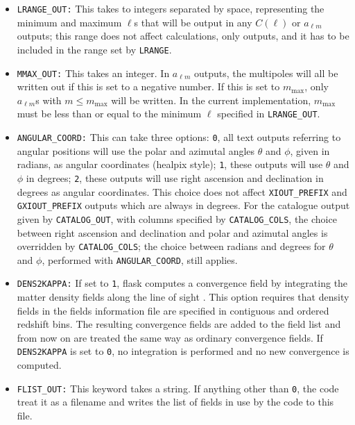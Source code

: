 \documentclass[12pt]{book} %
\newcommand{\nv}[1]{\mathrm{#1}}                 %
\begin{document}
\begin{itemize}
\item {\tt LRANGE\_OUT:} This takes to integers separated by space, representing the minimum and 
  maximum $\ell$s that will be output in any $C(\ell)$ or $a_{\ell m}$ outputs; this range does 
  not affect calculations, only outputs, and it has to be included in the range set by {\tt LRANGE}.
  
\item {\tt MMAX\_OUT:} This takes an integer. In $a_{\ell m}$ outputs, the multipoles will all 
  be written out if this is set to a negative number. If this is set to $m_{\nv{max}}$, only $a_{\ell m}$s 
  with $m\leq m_{\nv{max}}$ will be written. In the current implementation, $m_{\nv{max}}$ must be less than 
  or equal to the minimum $\ell$ specified in {\tt LRANGE\_OUT}.

\item {\tt ANGULAR\_COORD:} This can take three options: {\tt 0}, all text outputs referring 
  to angular positions will use the polar and azimutal angles $\theta$ and $\phi$, given in radians, 
  as angular coordinates ({\sc healpix} style); {\tt 1}, these outputs will use $\theta$ and $\phi$ 
  in degrees; {\tt 2}, these outputs will use right ascension and declination in degrees as 
  angular coordinates. This choice does not affect {\tt XIOUT\_PREFIX} and {\tt GXIOUT\_PREFIX} 
  outputs which are always in degrees. For the catalogue output given by {\tt CATALOG\_OUT}, 
  with columns specified by {\tt CATALOG\_COLS}, the choice between right ascension and declination and 
  polar and azimutal angles is overridden by {\tt CATALOG\_COLS}; the choice between radians and degrees 
  for $\theta$ and $\phi$, performed with {\tt ANGULAR\_COORD}, still applies.

\item {\tt DENS2KAPPA:} If set to {\tt 1}, {\sc flask} computes a convergence field by integrating 
  the matter density fields along the line of sight \citep[see][for details]{Xavier16mn}. This 
  option requires that density fields in the fields information file are specified in contiguous 
  and ordered redshift bins. The resulting convergence fields are added to the field list and from 
  now on are treated the same way as ordinary convergence fields. If {\tt DENS2KAPPA} is set to {\tt 0}, 
  no integration is performed and no new convergence is computed. 

\item {\tt FLIST\_OUT:} This keyword takes a string. If anything other than {\tt 0}, the code 
  treat it as a filename and writes the list of fields in use by the code to this file. 


\end{itemize}
\end{document}
